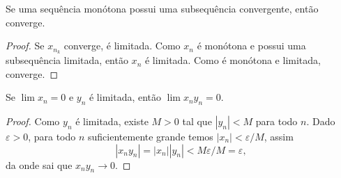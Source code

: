 \begin{corollary}
    Se uma sequência monótona possui uma subsequência convergente, então converge.
\end{corollary}
\begin{proof}
    Se $x_{n_k}$ converge, é limitada. Como $x_n$ é monótona e possui uma subsequência limitada, então $x_n$ é limitada. Como é monótona e limitada, converge.
\end{proof}

\begin{theorem}
    Se $\lim x_n = 0$ e $y_n$ é limitada, então $\lim x_ny_n = 0$.
\end{theorem}
\begin{proof}
    Como $y_n$ é limitada, existe $M > 0$ tal que $|y_n|<  M$ para todo $n$. Dado $\varepsilon > 0$, para todo $n$ suficientemente grande temos $|x_n| < \varepsilon/M$, assim \begin{equation}
        |x_n y_n| = |x_n||y_n| < M \varepsilon/M = \varepsilon,
    \end{equation} da onde sai que $x_ny_n \to 0$.
\end{proof}

